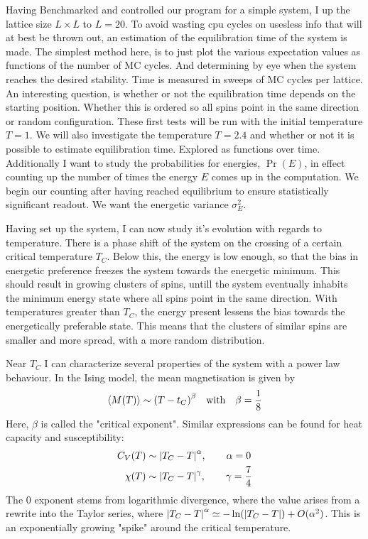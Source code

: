 \documentclass[10pt, twocolumn]{revtex4-1}
\begin{document}
Having Benchmarked and controlled our program for a simple system, I up the lattice size $L\times L$ to $L=20$. To avoid wasting cpu cycles on usesless
info that will at best be thrown out, an estimation of the equilibration time of the system is made. The simplest method here, is to just plot the
various expectation values as functions of the number of MC cycles. And determining by eye when the system reaches the desired stability. Time is measured in
sweeps of MC cycles per lattice. An interesting question, is whether or not the equilibration time depends on the starting position. Whether this is
ordered so all spins point in the same direction or random configuration. These first tests will be run with the initial temperature $T=1$. We will also
investigate the temperature $T = 2.4$ and whether or not it is possible to estimate equilibration time. Explored as functions over time.
Additionally I want to study the probabilities for energies, $\Pr(E)$, in effect counting up the number of times the energy $E$ comes up in the computation.
We begin our counting after having reached equilibrium to ensure statistically significant readout. We want the energetic variance $\sigma_E^2$.

Having set up the system, I can now study it's evolution with regards to temperature. There is a phase shift of the system on the crossing of
a certain critical temperature $T_C$. Below this, the energy is low enough, so that the bias in energetic preference freezes the system towards the energetic
minimum. This should result in growing clusters of spins, untill the system eventually inhabits the minimum energy state where all spins point in the same
direction. With temperatures greater than $T_C$, the energy present lessens the bias towards the energetically preferable state. This means that the clusters
of similar spins are smaller and more spread, with a more random distribution.

Near $T_C$ I can characterize several properties of the system with a power law behaviour. In the Ising model, the mean magnetisation is given by
\[ \ev{M(T)} \sim \qty( T - t_C )^{\beta} \qq{with} \beta = \frac{1}{8} \]
Here, $\beta$ is called the "critical exponent". %
Similar expressions can be found for heat capacity and susceptibility:
\begin{align*}
    C_V(T) &\sim \qty| T_C - T |^{\alpha}, \qq{} \alpha = 0 \\
    \chi(T) &\sim \qty| T_C - T |^{\gamma}, \qq{} \gamma = \frac{7}{4}
\end{align*}
The 0 exponent stems from logarithmic divergence, where the value
arises from a rewrite into the Taylor series, where $\qty| T_C - T |^{\alpha} \simeq -\ln(\qty| T_C - T | ) + O(\alpha^2)$. This is an exponentially growing
"spike" around the critical temperature.
\end{document}
